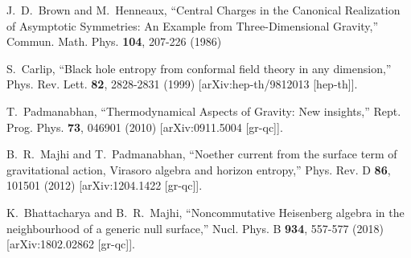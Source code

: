 \documentclass[prd, preprint, longbibliography, 12pt]{revtex4-2}
\begin{document}
\begin{thebibliography}{9}
J.~D.~Brown and M.~Henneaux,
``Central Charges in the Canonical Realization of Asymptotic Symmetries: An Example from Three-Dimensional Gravity,''
Commun. Math. Phys. \textbf{104}, 207-226 (1986)

S.~Carlip,
``Black hole entropy from conformal field theory in any dimension,''
Phys. Rev. Lett. \textbf{82}, 2828-2831 (1999)
[arXiv:hep-th/9812013 [hep-th]].

T.~Padmanabhan,
``Thermodynamical Aspects of Gravity: New insights,''
Rept. Prog. Phys. \textbf{73}, 046901 (2010)
[arXiv:0911.5004 [gr-qc]].

B.~R.~Majhi and T.~Padmanabhan,
``Noether current from the surface term of gravitational action, Virasoro algebra and horizon entropy,''
Phys. Rev. D \textbf{86}, 101501 (2012)
[arXiv:1204.1422 [gr-qc]].

K.~Bhattacharya and B.~R.~Majhi,
``Noncommutative Heisenberg algebra in the neighbourhood of a generic null surface,''
Nucl. Phys. B \textbf{934}, 557-577 (2018)
[arXiv:1802.02862 [gr-qc]].

\end{thebibliography}



\end{document}
